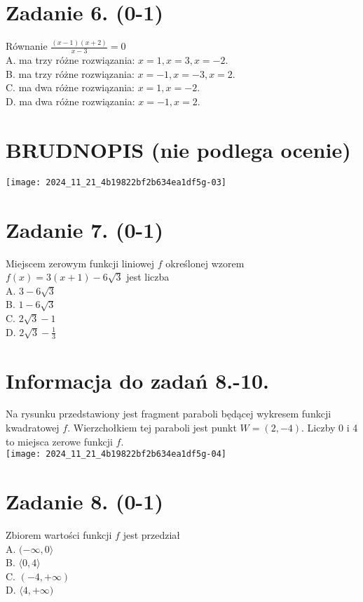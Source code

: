 \documentclass[10pt]{article}
\begin{document}
\section*{Zadanie 6. (0-1)}
Równanie \(\frac{(x-1)(x+2)}{x-3}=0\)\\
A. ma trzy różne rozwiązania: \(x=1, x=3, x=-2\).\\
B. ma trzy różne rozwiązania: \(x=-1, x=-3, x=2\).\\
C. ma dwa różne rozwiązania: \(x=1, x=-2\).\\
D. ma dwa różne rozwiązania: \(x=-1, x=2\).

\section*{BRUDNOPIS (nie podlega ocenie)}
\begin{center}
\texttt{[image: 2024\_11\_21\_4b19822bf2b634ea1df5g-03]}
\end{center}

\section*{Zadanie 7. (0-1)}
Miejscem zerowym funkcji liniowej \(f\) określonej wzorem \(f(x)=3(x+1)-6 \sqrt{3}\) jest liczba\\
A. \(3-6 \sqrt{3}\)\\
B. \(1-6 \sqrt{3}\)\\
C. \(2 \sqrt{3}-1\)\\
D. \(2 \sqrt{3}-\frac{1}{3}\)

\section*{Informacja do zadań 8.-10.}
Na rysunku przedstawiony jest fragment paraboli będącej wykresem funkcji kwadratowej \(f\). Wierzchołkiem tej paraboli jest punkt \(W=(2,-4)\). Liczby 0 i 4 to miejsca zerowe funkcji \(f\).\\
\texttt{[image: 2024\_11\_21\_4b19822bf2b634ea1df5g-04]}

\section*{Zadanie 8. (0-1)}
Zbiorem wartości funkcji \(f\) jest przedział\\
A. \((-\infty, 0\rangle\)\\
B. \(\langle 0,4\rangle\)\\
C. \((-4,+\infty)\)\\
D. \(\langle 4,+\infty)\)
\end{document}
